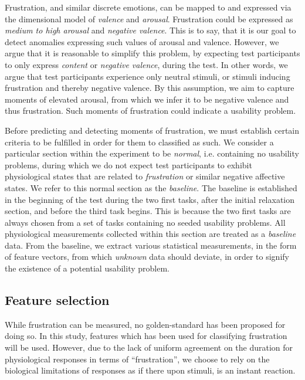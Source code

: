 Frustration, and similar discrete emotions, can be mapped to and expressed via the dimensional model of \textit{valence}
and \textit{arousal}. Frustration could be expressed as \textit{medium to high arousal} and \textit{negative
  valence}. This is to say, that it is our goal to detect anomalies expressing such values of arousal and
valence. However, we argue that it is reasonable to simplify this problem, by expecting test participants to only
express \textit{content} or \textit{negative valence}, during the test. In other words, we argue that test participants
experience only neutral stimuli, or stimuli inducing frustration and thereby negative valence. By this assumption, we
aim to capture moments of elevated arousal, from which we infer it to be negative valence and thus frustration.
Such moments of frustration could indicate a usability problem.

Before predicting and detecting moments of frustration, we must establish certain criteria to be fulfilled in order for
them to classified as such.  We consider a particular section within the experiment to be \textit{normal},
i.e. containing no usability problems, during which we do not expect test participants to exhibit physiological states
that are related to \textit{frustration} or similar negative affective states. We refer to this normal section as the
\textit{baseline}. The baseline is established in the beginning of the test during the two first tasks, after the
initial relaxation section, and before the third task begins. This is because the two first tasks are always chosen from
a set of tasks containing no seeded usability problems. All physiological measurements collected within this section are
treated as a \textit{baseline} data.  From the baseline, we extract various statistical measurements, in the form of
feature vectors, from which \textit{unknown} data should deviate, in order to signify the existence of a potential
usability problem.

\subsection{Feature selection}

While frustration can be measured, no golden-standard has been proposed for doing so.  In this study, features which has
been used for classifying frustration will be used.  However, due to the lack of uniform agreement on the duration for
physiological responses in terms of ``frustration'', we choose to rely on the biological limitations of
responses as if there upon stimuli, is an instant reaction.

